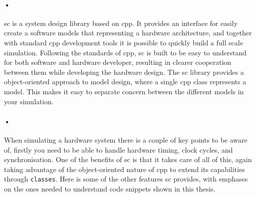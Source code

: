 \documentclass[a4paper]{report}
\newcommand{\codeword}[1]{\texttt{#1}}
\begin{document}
\paragraph{•}
\gls{sc} is a system design library based on \gls{cpp}. 
It provides an interface for easily create a software models that representing a hardware architecture, and together with standard \gls{cpp} development tools it is possible to quickly build a full scale simulation.
Following the standards of \gls{cpp}, \gls{sc} is built to be easy to understand for both software and hardware developer, resulting in clearer cooperation between them while developing the hardware design.
The \gls{sc} library provides a object-oriented approach to model design, where a single \gls{cpp} class represents a model.
This makes it easy to separate concern between the different models in your simulation.
\paragraph{•}
When simulating a hardware system there is a couple of key points to be aware of, firstly you need to be able to handle hardware timing, clock cycles, and synchronisation.
One of the benefits of \gls{sc} is that it takes care of all of this, again taking advantage of the object-oriented nature of \gls{cpp} to extend its capabilities through \codeword{classes}.
Here is some of the other features \gls{sc} provides, with emphases on the ones needed to understand code snippets shown in this thesis.
\end{document}
